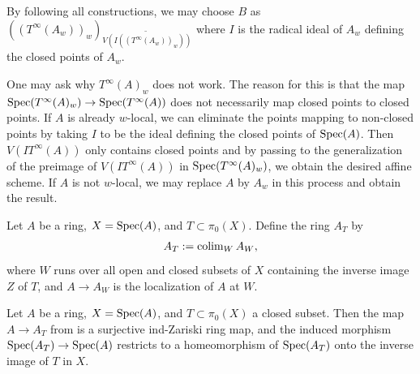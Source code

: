\begin{remark}
    By following all constructions, we may choose $B$
    as $((T^{\infty}(A_w))_w)_{\widetilde{V(I ((T^{\infty}(A_w))_w))}}$
    where $I$ is the radical ideal of $A_w$ defining the closed points of $A_w$.

    One may ask why $T^\infty(A)_w$ does not work. The reason for this is
    that the map $\mathrm{Spec}(T^{\infty}(A)_w) \to \mathrm{Spec}(T^{\infty}(A))$ does not necessarily
    map closed points to closed points. If $A$ is already $w$-local,
    we can eliminate the points mapping to non-closed points by taking $I$ to be the ideal defining
    the closed points of $\mathrm{Spec}(A)$.
    Then $V(I T^{\infty}(A))$ only contains closed points and by
    passing to the generalization of the preimage of $V(I T^{\infty}(A))$ in
    $\mathrm{Spec}(T^{\infty}(A)_w)$, we obtain the desired affine scheme. If $A$ is not $w$-local,
    we may replace $A$ by $A_w$ in this process and obtain the result.
\end{remark}

\begin{definition}
  \label{def:colim-open-closed-localizations}
  \leanok
  Let $A$ be a ring, $X = \operatorname{Spec}(A)$, and $T \subset \pi_0(X)$. Define the ring $A_T$ by
  \[ 
    A_T := \operatorname{colim}_{W} A_W,
  \]
  where $W$ runs over all open and closed subsets of $X$ containing the inverse image $Z$ of $T$, 
  and $A \to A_W$ is the localization of $A$ at $W$.
\end{definition}

\begin{lemma}
  \label{thm:colim-open-closed-localizations-surj-ind-zariski}
  \leanok
  Let $A$ be a ring, $X = \operatorname{Spec}(A)$, and $T \subset \pi_0(X)$ a closed subset. 
  Then the map $A \to A_T$ from  is a surjective 
  ind-Zariski ring map, and the induced morphism $\operatorname{Spec}(A_T) \to \operatorname{Spec}(A)$ restricts to a 
  homeomorphism of $\operatorname{Spec}(A_T)$ onto the inverse image of $T$ in $X$.
\end{lemma}

